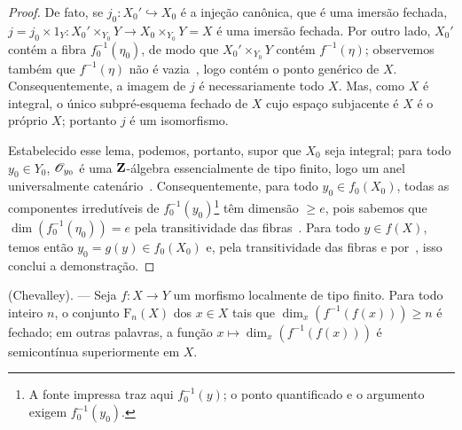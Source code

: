 \begin{proof}
De fato, se $j_0:X_0'\hookrightarrow X_0$ é a injeção canônica,
que é uma imersão fechada,
$j=j_0\times 1_Y:X_0'\times_{Y_0}Y\to X_0\times_{Y_0}Y=X$
é uma imersão fechada.
Por outro lado, $X_0'$ contém a fibra $f_0^{-1}(\eta_0)$,
de modo que $X_0'\times_{Y_0}Y$ contém $f^{-1}(\eta)$;
observemos também que $f^{-1}(\eta)$ não é vazia~,
logo contém o ponto genérico de $X$.
Consequentemente, a imagem de $j$ é necessariamente todo $X$.
Mas, como $X$ é integral, o único subpré-esquema fechado de $X$
cujo espaço subjacente é $X$ é o próprio $X$;
portanto $j$ é um isomorfismo.

Estabelecido esse lema, podemos, portanto, supor que $X_0$ seja integral;
para todo $y_0\in Y_0$, $\mathscr{O}_{y_0}$ é uma $\mathbf{Z}$-álgebra
essencialmente de tipo finito, logo um anel universalmente
catenário~.
Consequentemente, para todo $y_0\in f_0(X_0)$, todas as componentes
irredutíveis de $f_0^{-1}(y_0)$\footnote{A fonte impressa traz aqui
$f_0^{-1}(y)$; o ponto quantificado e o argumento exigem $f_0^{-1}(y_0)$.}
têm dimensão $\geq e$, pois sabemos que
$\dim(f_0^{-1}(\eta_0))=e$ pela transitividade das fibras~.
Para todo $y\in f(X)$, temos então $y_0=g(y)\in f_0(X_0)$ e,
pela transitividade das fibras e por~,
isso conclui a demonstração.
\end{proof}

\begin{theorem}[13.1.3]
\label{IV.13.1.3}
\textnormal{(Chevalley).} ---
Seja $f:X\to Y$ um morfismo localmente de tipo finito.
Para todo inteiro $n$, o conjunto $\mathrm{F}_n(X)$ dos $x\in X$
tais que $\dim_x(f^{-1}(f(x)))\geq n$ é fechado;
em outras palavras, a função $x\mapsto\dim_x(f^{-1}(f(x)))$
é semicontínua superiormente em $X$.
\end{theorem}

